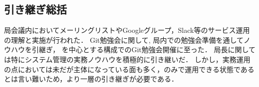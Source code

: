 \subsection*{引き継ぎ総括}


局会議内においてメーリングリストやGoogleグループ，Slack等のサービス運用の理解と実施が行われた．
Git勉強会に関して, 局内での勉強会準備を通してノウハウを引継ぎ， \secondGrade{}を中心とする構成でのGit勉強会開催に至った．
局長に関しては特にシステム管理の実務ノウハウを積極的に引き継いだ．
しかし，実務運用の点においては未だ\fourthGrade{}が主体になっている面も多く，\secondGrade{}のみで運用できる状態であるとは言い難いため，より一層の引き継ぎが必要である．

